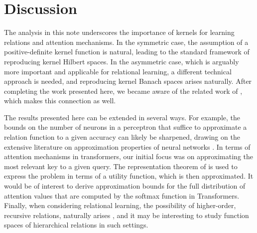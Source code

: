 \section{Discussion}

The analysis in this note underscores the importance of kernels for learning relations and attention mechanisms. In the symmetric case, the assumption of a positive-definite kernel function is natural, leading to the standard framework of reproducing kernel Hilbert spaces. In the asymmetric case, which is arguably more important and applicable for relational learning, a different technical approach is needed, and reproducing kernel Banach spaces arises naturally. After completing the work presented here, we became aware of the related work of \citet{wright2021transformers}, which makes this connection as well.

The results presented here can be extended in several ways. For example, the bounds on the number of neurons in a perceptron that suffice to approximate a relation function to a given accuracy can likely be sharpened, drawing on the extensive literature on approximation properties of neural networks \citep[e.g.,][]{petrushev1998approximation,pinkus1999approximation,makovoz1998uniform,burger2001error,maiorov2006approximation,bachBreakingCurseDimensionality2016}. In terms of attention mechanisms in transformers, our initial focus was on approximating the most relevant key to a given query. The representation theorem of \citet{debreuRepresentationPreferenceOrdering1954} is used to express the problem in terms of a utility function, which is then approximated. It would be of interest to derive approximation bounds for the full distribution of attention values that are computed by the softmax function in Transformers. Finally, when considering relational learning, the possibility of higher-order, recursive relations, naturally arises \citep[e.g.,][]{altabaaRelationalConvolutionalNetworks2023}, and it may be interesting to study function spaces of hierarchical relations in such settings.
